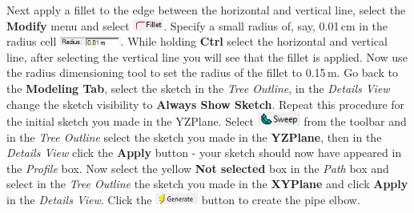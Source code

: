 \documentclass[12pts,a4paper,amsmath,amssymb,floatfix]{article}%
\newcommand\bfr[1]{\textcolor[rgb]{1,0.00,0.00}{\textbf{\textsf{#1}}}}
\begin{document}
Next apply a fillet to the edge between the horizontal and vertical line, select the \bfr{Modify} menu and select \includegraphics[width=1cm]{./Pics/fillet.png}.  Specify a small radius of, say, 0.01\,cm in the radius cell \includegraphics[width=2cm]{./Pics/fillet_radius.png}. While holding \bfr{Ctrl} select the horizontal and vertical line, after selecting the vertical line you will see that the fillet is applied. Now use the radius dimensioning tool to set the radius of the fillet to 0.15\,m. Go back to the \bfr{Modeling Tab}, select the sketch in the \emph{Tree Outline}, in the \emph{Details View} change the sketch visibility to \bfr{Always Show Sketch}. Repeat this procedure for the initial sketch you made in the YZPlane. Select \includegraphics[width=1.4cm]{./Pics/sweep.png} from the toolbar and in the \emph{Tree Outline} select the sketch you made in the \bfr{YZPlane}, then in the \emph{Details View} click the \bfr{Apply} button - your sketch should now have appeared in the \emph{Profile} box. Now select the yellow \bfr{Not selected} box in the \emph{Path} box and select in the \emph{Tree Outline} the sketch you made in the \bfr{XYPlane} and click \bfr{Apply} in the \emph{Details View}. Click the \includegraphics[width=1.4cm]{./Pics/generate_button.png} button to create the pipe elbow.
\end{document}
